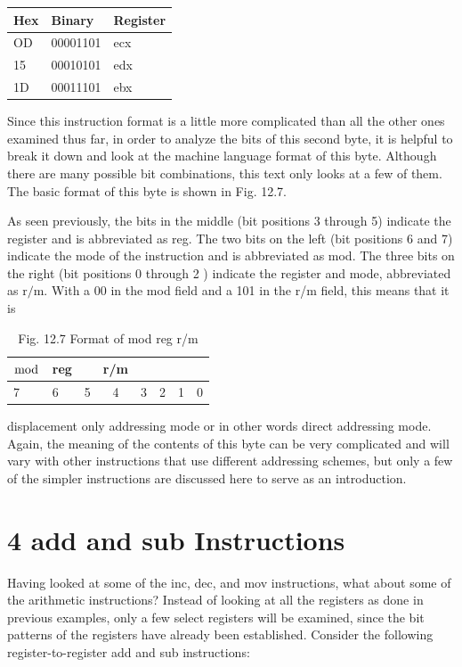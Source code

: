 \documentclass[10pt]{article}
\begin{document}
\begin{center}
\begin{tabular}{|l|l|l|}
\hline
Hex & Binary & Register \\
\hline
OD & 00001101 & ecx \\
\hline
15 & 00010101 & edx \\
\hline
1D & 00011101 & ebx \\
\hline
\end{tabular}
\end{center}

Since this instruction format is a little more complicated than all the other ones examined thus far, in order to analyze the bits of this second byte, it is helpful to break it down and look at the machine language format of this byte. Although there are many possible bit combinations, this text only looks at a few of them. The basic format of this byte is shown in Fig. 12.7.

As seen previously, the bits in the middle (bit positions 3 through 5) indicate the register and is abbreviated as reg. The two bits on the left (bit positions 6 and 7) indicate the mode of the instruction and is abbreviated as mod. The three bits on the right (bit positions 0 through 2 ) indicate the register and mode, abbreviated as $\mathrm{r} / \mathrm{m}$. With a 00 in the mod field and a 101 in the r/m field, this means that it is

\begin{table}[h]
\begin{center}
\begin{tabular}{|ll|lcllll|}
\hline
$\bmod$ & reg &  & r/m &  &  &  &  \\
\hline
7 & 6 & 5 & 4 & 3 & 2 & 1 & 0 \\
\hline
\end{tabular}
\captionsetup{labelformat=empty}
\caption{Fig. 12.7 Format of mod reg r/m}
\end{center}
\end{table}

displacement only addressing mode or in other words direct addressing mode. Again, the meaning of the contents of this byte can be very complicated and will vary with other instructions that use different addressing schemes, but only a few of the simpler instructions are discussed here to serve as an introduction.

\section*{4 add and sub Instructions}
Having looked at some of the inc, dec, and mov instructions, what about some of the arithmetic instructions? Instead of looking at all the registers as done in previous examples, only a few select registers will be examined, since the bit patterns of the registers have already been established. Consider the following register-to-register add and sub instructions:
\end{document}
